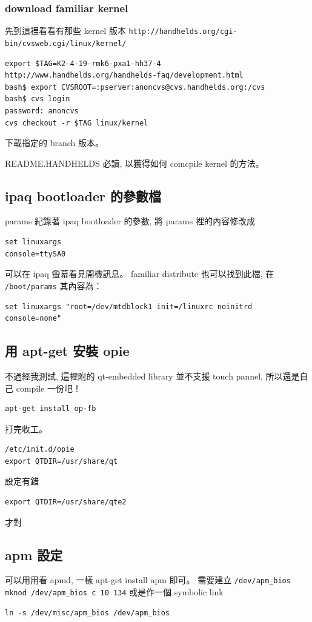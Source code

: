 \documentclass[12pt,a4paper]{article}
\begin{document}
\begin{CJK}{UTF8}{cwmu}
\subsubsection{download familiar kernel}
先到這裡看看有那些 kernel 版本
\verb+http://handhelds.org/cgi-bin/cvsweb.cgi/linux/kernel/+

\begin{verbatim}
export $TAG=K2-4-19-rmk6-pxa1-hh37-4
http://www.handhelds.org/handhelds-faq/development.html
bash$ export CVSROOT=:pserver:anoncvs@cvs.handhelds.org:/cvs
bash$ cvs login
password: anoncvs
cvs checkout -r $TAG linux/kernel
\end{verbatim}
下載指定的 branch 版本。

README.HANDHELDS 必讀, 以獲得如何 comcpile kernel 的方法。

\subsection{ipaq bootloader 的參數檔}
params 紀錄著 ipaq bootloader 的參數,
將 params 裡的內容修改成

\begin{verbatim}
set linuxargs
console=ttySA0
\end{verbatim}

可以在 ipaq 螢幕看見開機訊息。
familiar distribute 也可以找到此檔, 在 \verb+/boot/params+
其內容為：
\begin{verbatim}
set linuxargs "root=/dev/mtdblock1 init=/linuxrc noinitrd console=none"
\end{verbatim}

\subsection{用 apt-get 安裝 opie}
不過經我測試, 這裡附的 qt-embedded library 並不支援 touch pannel,
所以還是自己 compile 一份吧！
\begin{verbatim}
apt-get install op-fb
\end{verbatim}
打完收工。
\begin{verbatim}
/etc/init.d/opie
export QTDIR=/usr/share/qt
\end{verbatim}
設定有錯
\begin{verbatim}
export QTDIR=/usr/share/qte2
\end{verbatim}
才對

\subsection{apm 設定}
可以用用看 apmd, 一樣 apt-get install apm 即可。
需要建立 \verb+/dev/apm_bios+
\verb+mknod /dev/apm_bios c 10 134+
或是作一個 symbolic link
\begin{verbatim}
ln -s /dev/misc/apm_bios /dev/apm_bios
\end{verbatim}


\end{CJK}
\end{document}
